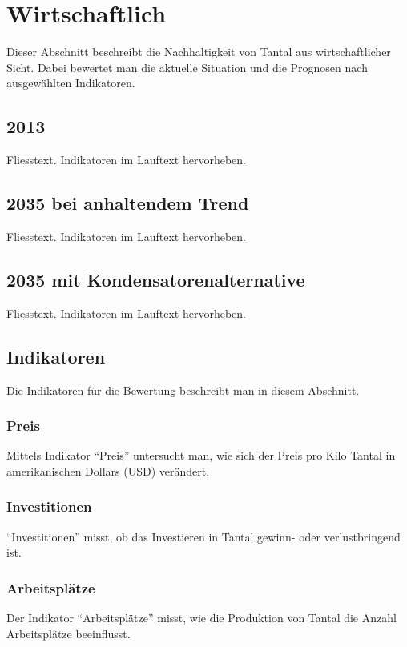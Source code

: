 
\section{Wirtschaftlich}\label{sec:conflict}
Dieser Abschnitt beschreibt die Nachhaltigkeit von Tantal aus wirtschaftlicher
Sicht. Dabei bewertet man die aktuelle Situation und die Prognosen nach
ausgewählten Indikatoren.

\subsection{2013}
Fliesstext. Indikatoren im Lauftext hervorheben.

\subsection{2035 bei anhaltendem Trend}
Fliesstext. Indikatoren im Lauftext hervorheben.

\subsection{2035 mit Kondensatorenalternative}
Fliesstext. Indikatoren im Lauftext hervorheben.

\iffalse
\subsection{Indikatoren}
Die Indikatoren für die Bewertung beschreibt man in diesem Abschnitt.

\subsubsection{Preis}
Mittels Indikator ``Preis'' untersucht man, wie sich der Preis pro Kilo Tantal
in amerikanischen Dollars (USD) verändert.

\subsubsection{Investitionen}
``Investitionen'' misst, ob das Investieren in Tantal gewinn- oder
verlustbringend ist.

\subsubsection{Arbeitsplätze}
Der Indikator ``Arbeitsplätze'' misst, wie die Produktion von Tantal die Anzahl
Arbeitsplätze beeinflusst.

